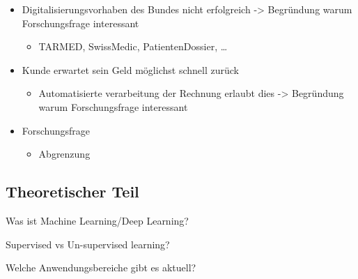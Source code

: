 \documentclass[12pt, twoside]{extarticle}
\begin{document}
\begin{itemize}
	\item Digitalisierungsvorhaben des Bundes nicht erfolgreich -> Begründung warum Forschungsfrage interessant
    \begin{itemize}
        \item TARMED, SwissMedic, PatientenDossier, …
    \end{itemize}
    \item Kunde erwartet sein Geld möglichst schnell zurück
    \begin{itemize}
        \item Automatisierte verarbeitung der Rechnung erlaubt dies  -> Begründung warum Forschungsfrage interessant
    \end{itemize}
    \item Forschungsfrage
    \begin{itemize}
        \item Abgrenzung
    \end{itemize}
\end{itemize}
	
	
\subsection{Theoretischer Teil}
Was ist Machine Learning/Deep Learning?

Supervised vs Un-supervised learning?

Welche Anwendungsbereiche gibt es aktuell?
\end{document}
